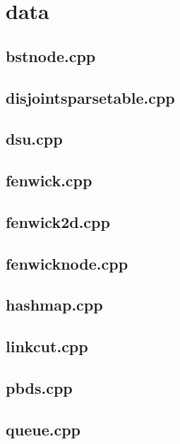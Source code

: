 \section{data}

\subsection{bstnode.cpp}


\subsection{disjointsparsetable.cpp}


\subsection{dsu.cpp}


\subsection{fenwick.cpp}


\subsection{fenwick2d.cpp}


\subsection{fenwicknode.cpp}


\subsection{hashmap.cpp}


\subsection{linkcut.cpp}


\subsection{pbds.cpp}


\subsection{queue.cpp}


